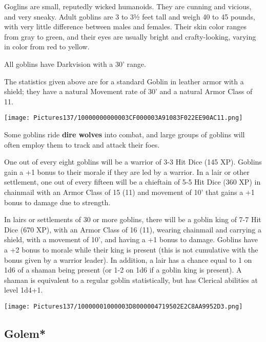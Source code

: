 \documentclass[a4paper,twoside,openany,10pt]{book}
\begin{document}
\begin{multicols}{2}
Goglins are small, reputedly wicked humanoids. They are cunning and vicious, and very sneaky. Adult goblins are 3 to 3½ feet tall and weigh 40 to 45 pounds, with very little difference between males and females. Their skin color ranges from gray to green, and their eyes are usually bright and crafty-looking, varying in color from red to yellow.

All goblins have Darkvision with a 30' range.

The statistics given above are for a standard Goblin in leather armor with a shield; they have a natural Movement rate of 30' and a natural Armor Class of 11.

\begin{center}
	\texttt{[image: Pictures137/10000000000003CF000003A91083F022EE90AC11.png]}
\end{center}

Some goblins ride \textbf{dire wolves} into combat, and large groups of goblins will often employ them to track and attack their foes.

One out of every eight goblins will be a warrior of 3-3 Hit Dice (145 XP). Goblins gain a +1 bonus to their morale if they are led by a warrior. In a lair or other settlement, one out of every fifteen will be a chieftain of 5-5 Hit Dice (360 XP) in chainmail with an Armor Class of 15 (11) and movement of 10' that gains a +1 bonus to damage due to strength. 


In lairs or settlements of 30 or more goblins, there will be a goblin king of 7-7 Hit Dice (670 XP), with an Armor Class of 16 (11), wearing chainmail and carrying a shield, with a movement of 10', and having a +1 bonus to damage. Goblins have a +2 bonus to morale while their king is present (this is not cumulative with the bonus given by a warrior leader). In addition, a lair has a chance equal to 1 on 1d6 of a shaman being present (or 1-2 on 1d6 if a goblin king is present). A shaman is equivalent to a regular goblin statistically, but has Clerical abilities at level 1d4+1.


\begin{center}
	\texttt{[image: Pictures137/10000001000003D8000004719502E2C8AA9952D3.png]}
\end{center}

\columnbreak


\subsection*{Golem*}\label{golem}


\end{multicols}
\end{document}
